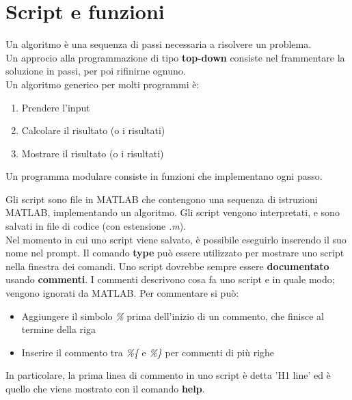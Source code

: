 \documentclass[a4paper, 10pt]{article}
\begin{document}
\newpage

\section{Script e funzioni}

Un algoritmo è una sequenza di passi necessaria a risolvere un problema.\\
Un approcio alla programmazione di tipo \textbf{top-down} consiste nel frammentare la soluzione in passi, per poi rifinirne ognuno.\\
Un algoritmo generico per molti programmi è:

\begin{enumerate}
\item Prendere l'input
\item Calcolare il risultato (o i risultati)
\item Mostrare il risultato (o i risultati)
\end{enumerate}
Un programma modulare consiste in funzioni che implementano ogni passo.

Gli script sono file in MATLAB che contengono una sequenza di istruzioni MATLAB, implementando un algoritmo.
Gli script vengono interpretati, e sono salvati in file di codice (con estensione \textit{.m}).\\
Nel momento in cui uno script viene salvato, è possibile eseguirlo inserendo il suo nome nel prompt. Il comando \textbf{type} può essere utilizzato per mostrare uno script nella finestra dei comandi.
Uno script dovrebbe sempre essere \textbf{documentato} usando \textbf{commenti}. I commenti descrivono cosa fa uno script e in quale modo; vengono ignorati da MATLAB. Per commentare si può:

\begin{itemize}
\item Aggiungere il simbolo \textit{\%} prima dell'inizio di un commento, che finisce al termine della riga
\item Inserire il commento tra \textit{\%\{ } e \textit{\%\} } per commenti di più righe
\end{itemize}

In particolare, la prima linea di commento in uno script è detta 'H1 line' ed è quello che viene mostrato con il comando \textbf{help}.
\end{document}
